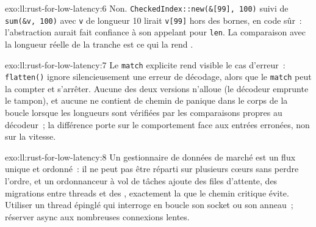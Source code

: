 \begin{solution}{exo:ll:rust-for-low-latency:6}
Non. \texttt{CheckedIndex::new(\&[99], 100)} suivi de \texttt{sum(\&v, 100)} avec \texttt{v} de longueur 10 lirait
\texttt{v[99]} hors des bornes, en code sûr~: l'abstraction aurait fait confiance à son appelant pour \texttt{len}. La comparaison
avec la longueur réelle de la tranche est ce qui la rend .
\end{solution}

\begin{solution}{exo:ll:rust-for-low-latency:7}
Le \texttt{match} explicite rend visible le cas d'erreur~: \texttt{flatten()} ignore silencieusement une erreur de décodage, alors que le
\texttt{match} peut la compter et s'arrêter. Aucune des deux versions n'alloue (le décodeur emprunte le tampon), et aucune ne contient
de chemin de panique dans le corps de la boucle lorsque les longueurs sont vérifiées par les comparaisons propres au décodeur~; la
différence porte sur le comportement face aux entrées erronées, non sur la vitesse.
\end{solution}

\begin{solution}{exo:ll:rust-for-low-latency:8}
Un gestionnaire de données de marché est un flux unique et ordonné~: il ne peut pas être réparti sur plusieurs cœurs sans perdre l'ordre, et un ordonnanceur à
vol de tâches ajoute des files d'attente, des migrations entre threads et des , exactement la  que le chemin critique évite. Utiliser un thread épinglé
qui interroge en boucle son socket ou son anneau~; réserver async aux nombreuses connexions lentes.
\end{solution}

